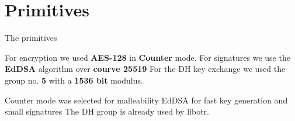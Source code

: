 \section{Primitives}

\begin{frame}
\Huge{\centerline{The primitives}}
\end{frame}

\begin{frame}
  For encryption we used {\bf AES-128} in {\bf Counter} mode.
  \vfill
  For signatures we use the {\bf EdDSA} algorithm over {\bf courve 25519}
  \vfill
  For the DH key exchange we used the group no. {\bf 5} with a {\bf 1536 bit} modulus.
\end{frame}

\begin{frame}
  Counter mode was selected for malleability
  \vfill
  EdDSA for fast key generation and small signatures
  \vfill
  The DH group is already used by libotr.
\end{frame}
